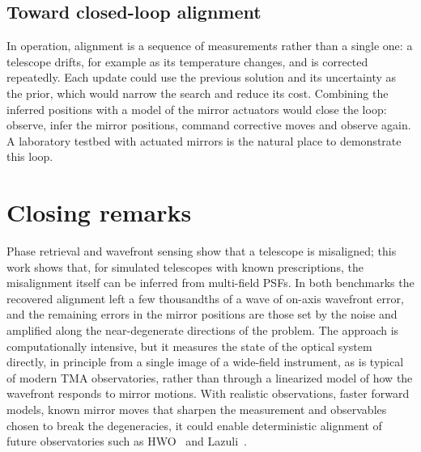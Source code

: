 \subsection{Toward closed-loop alignment}
In operation, alignment is a sequence of measurements rather than a single one: a telescope drifts, for example as its temperature changes, and is corrected repeatedly. Each update could use the previous solution and its uncertainty as the prior, which would narrow the search and reduce its cost. Combining the inferred positions with a model of the mirror actuators would close the loop: observe, infer the mirror positions, command corrective moves and observe again. A laboratory testbed with actuated mirrors is the natural place to demonstrate this loop.

\section{Closing remarks}\label{sec:conc_closing}

Phase retrieval and wavefront sensing show that a telescope is misaligned; this work shows that, for simulated telescopes with known prescriptions, the misalignment itself can be inferred from multi-field PSFs. In both benchmarks the recovered alignment left a few thousandths of a wave of on-axis wavefront error, and the remaining errors in the mirror positions are those set by the noise and amplified along the near-degenerate directions of the problem. The approach is computationally intensive, but it measures the state of the optical system directly, in principle from a single image of a wide-field instrument, as is typical of modern TMA observatories, rather than through a linearized model of how the wavefront responds to mirror motions. With realistic observations, faster forward models, known mirror moves that sharpen the measurement and observables chosen to break the degeneracies, it could enable deterministic alignment of future observatories such as HWO~\citep{HWO2023} and Lazuli~\citep{Roy2026}.
